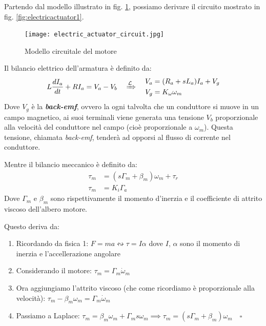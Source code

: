 Partendo dal modello illustrato in fig. \ref{fig:electricactuatorcircuit}, possiamo derivare il circuito mostrato in fig. \ref{fig:electricactuator1}.

\begin{figure}[th!]
	\centering
	\texttt{[image: electric\_actuator\_circuit.jpg]}
	\caption{Modello circuitale del motore}
	\label{fig:electricactuatorcircuit}
\end{figure}

Il bilancio elettrico dell'armatura è definito da:
\begin{align}\label{eq:armature_balance}
L\frac{dI_a}{dt} + RI_a = V_a - V_b
\quad
\xRightarrow{\mathcal {L}}
\quad
\begin{aligned}
V_a &= (R_a + sL_a)I_a + V_g\\
V_g &= K_{\omega} \omega_m
\end{aligned}
\end{align}
Dove $V_g$ è la \textbf{\textit{back-emf}}, ovvero la ogni talvolta che un conduttore si muove in un campo magnetico, ai suoi terminali viene generata una tensione $V_b$ proporzionale alla velocità del conduttore nel campo (cioè proporzionale a $\omega_m$). Questa tensione, chiamata \textit{back-emf}, tenderà ad opporsi al flusso di corrente nel conduttore.

Mentre il bilancio meccanico è definito da:
\begin{align}
\tau_m &= (s\Gamma_m + \beta_m)\omega_m + \tau_r \\
\tau_m &= K_i\Gamma_a
\end{align}
Dove $\Gamma_m$ e $\beta_m$ sono rispettivamente il momento d'inerzia e il coefficiente di attrito viscoso dell'albero motore.

Questo deriva da:
\begin{enumerate}
	\item Ricordando da fisica 1: $F = ma \leftrightsquigarrow \tau = I\alpha$ dove $I$, $\alpha$ sono il momento di inerzia e l'accellerazione angolare
	\item Considerando il motore: $\tau_m = \Gamma_m\dot{\omega}_m$
	\item Ora aggiungiamo l'attrito viscoso (che come ricordiamo è proporzionale alla velocità): $\tau_m - \beta_m\omega_m = \Gamma_m\dot{\omega}_m$
	\item Passiamo a Laplace: $\tau_m = \beta_m\omega_m + \Gamma_m s\omega_m \implies \tau_m = (s\Gamma_m + \beta_m)\omega_m \quad \square$ 
\end{enumerate}


